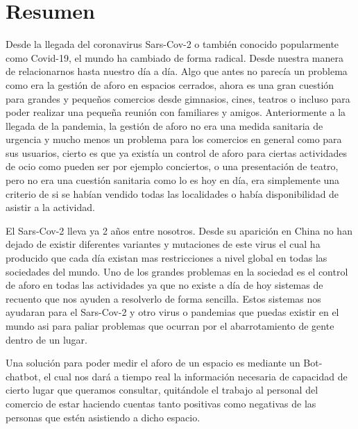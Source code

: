 \chapter*{Resumen}

Desde la llegada del coronavirus Sars-Cov-2 o también conocido popularmente como Covid-19, el mundo ha cambiado de forma radical. Desde nuestra manera de relacionarnos hasta nuestro día a día. Algo que antes no parecía un problema como era la gestión de aforo en espacios cerrados, ahora es una gran cuestión para grandes y pequeños comercios desde gimnasios, cines, teatros o incluso para poder realizar una pequeña reunión con familiares y amigos. Anteriormente a la llegada de la pandemia, la gestión de aforo no era una medida sanitaria de urgencia y mucho menos un problema para los comercios en general como para sus usuarios, cierto es que ya existía un control de aforo para ciertas actividades de ocio como pueden ser  por ejemplo conciertos, o una presentación de teatro, pero no era una cuestión sanitaria como lo es hoy en día, era simplemente una criterio de si se habían vendido todas las localidades o había disponibilidad de asistir a la actividad.

El Sars-Cov-2 lleva ya 2 años entre nosotros. Desde su aparición en China no han dejado de existir diferentes variantes y mutaciones de este virus el cual ha producido que cada día existan mas restricciones a nivel global en todas las sociedades del mundo. Uno de los grandes problemas en la sociedad es el control de aforo en todas las actividades ya que no existe a día de hoy sistemas de recuento que nos ayuden a resolverlo de forma sencilla. Estos sistemas nos ayudaran para el Sars-Cov-2 y otro virus o pandemias que puedas existir en el mundo asi para paliar problemas que ocurran por el abarrotamiento de gente dentro de un lugar.

Una solución para poder medir el aforo de un espacio es mediante un Bot-chatbot, el cual nos dará a tiempo real la información necesaria de capacidad de cierto lugar que queramos consultar, quitándole el trabajo al personal del comercio de estar haciendo cuentas tanto positivas como negativas de las personas que estén asistiendo a dicho espacio.

